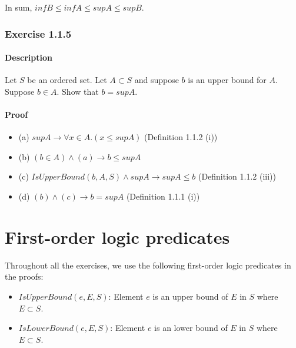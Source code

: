 \documentclass[12pt, letterpaper, oneside]{book}
\begin{document}
In sum, $inf B \le inf A \le sup A \le sup B$.

\subsection{Exercise 1.1.5}

\subsubsection{Description}

Let $S$ be an ordered set. Let $A \subset S$ and suppose $b$ is an upper bound for $A$. Suppose $b \in A$. Show that
$b = sup A$.

\subsubsection{Proof}

\begin{itemize}
  \item (a) $sup A \rightarrow \forall x \in A. (x \le sup A)$ (Definition 1.1.2 (i))
  \item (b) $(b \in A) \land (a) \rightarrow b \le sup A$
  \item (c) $IsUpperBound(b, A, S) \land sup A \rightarrow sup A \le b$ (Definition 1.1.2 (iii))
  \item (d) $(b) \land (c) \rightarrow b = sup A$ (Definition 1.1.1 (i))
\end{itemize}

%
%

\chapter{First-order logic predicates}

Throughout all the exercises, we use the following first-order logic predicates in the proofs:

\begin{itemize}
  \item $IsUpperBound(e, E, S)$: Element $e$ is an upper bound of $E$ in $S$ where $E \subset S$.
  \item $IsLowerBound(e, E, S)$: Element $e$ is an lower bound of $E$ in $S$ where $E \subset S$.
\end{itemize}
\end{document}
